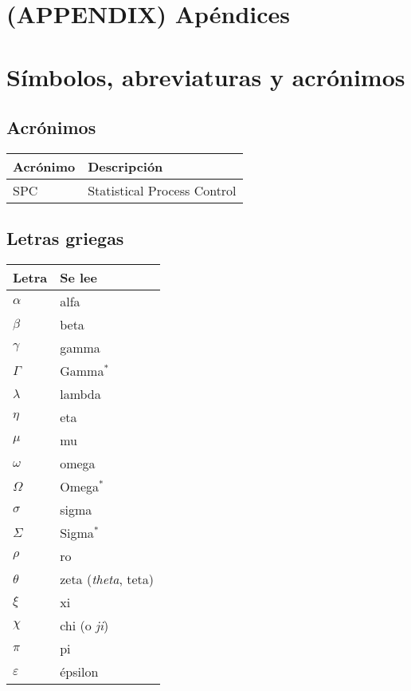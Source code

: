 \documentclass[
]{article}
\author{}
\date{\vspace{-2.5em}}
\begin{document}
\hypertarget{appendix-apuxe9ndices}{%
\section*{(APPENDIX) Apéndices}\label{appendix-apuxe9ndices}}

\hypertarget{suxedmbolos-abreviaturas-y-acruxf3nimos}{%
\section{Símbolos, abreviaturas y
acrónimos}\label{suxedmbolos-abreviaturas-y-acruxf3nimos}}

\hypertarget{acruxf3nimos}{%
\subsection{Acrónimos}\label{acruxf3nimos}}

\begin{longtable}[]{@{}ll@{}}
\toprule
Acrónimo & Descripción \\
\midrule
\endhead
SPC & Statistical Process Control \\
\bottomrule
\end{longtable}

\hypertarget{letras-griegas}{%
\subsection{Letras griegas}\label{letras-griegas}}

\begin{longtable}[]{@{}ll@{}}
\toprule
Letra & Se lee \\
\midrule
\endhead
\(\alpha\) & alfa \\
\(\beta\) & beta \\
\(\gamma\) & gamma \\
\(\Gamma\) & Gamma\(^*\) \\
\(\lambda\) & lambda \\
\(\eta\) & eta \\
\(\mu\) & mu \\
\(\omega\) & omega \\
\(\Omega\) & Omega\(^*\) \\
\(\sigma\) & sigma \\
\(\Sigma\) & Sigma\(^*\) \\
\(\rho\) & ro \\
\(\theta\) & zeta (\emph{theta}, teta) \\
\(\xi\) & xi \\
\(\chi\) & chi (o \emph{ji}) \\
\(\pi\) & pi \\
\(\varepsilon\) & épsilon \\
\bottomrule
\end{longtable}
\end{document}
